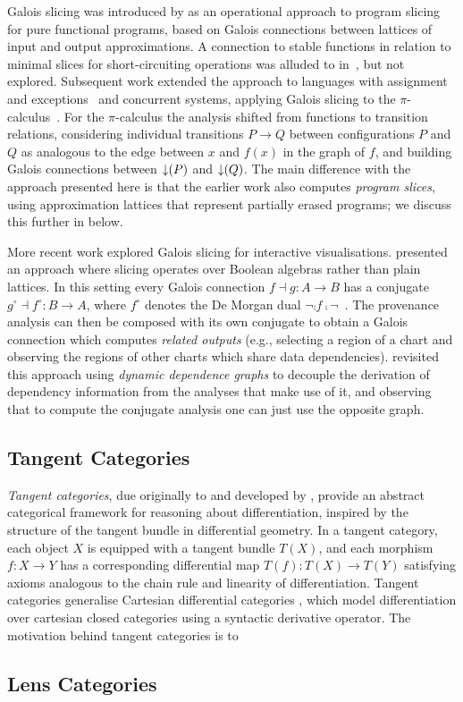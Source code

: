 Galois slicing was introduced by \citet{perera12a} as an operational approach to program slicing for pure
functional programs, based on Galois connections between lattices of input and output approximations. A
connection to stable functions in relation to minimal slices for short-circuiting operations was alluded to
in~\citet{perera13}, but not explored. Subsequent work extended the approach to languages with assignment and
exceptions~\cite{ricciotti17} and concurrent systems, applying Galois slicing to the
$\pi$-calculus~\cite{perera16d}. For the $\pi$-calculus the analysis shifted from functions to transition
relations, considering individual transitions $P \longrightarrow Q$ between configurations $P$ and $Q$ as
analogous to the edge between $x$ and $f(x)$ in the graph of $f$, and building Galois connections between
$\mathop{\downarrow}(P)$ and $\mathop{\downarrow}(Q)$. The main difference with the approach presented here is that the earlier work
also computes \emph{program slices}, using approximation lattices that represent partially erased programs; we
discuss this further in  below.

More recent work explored Galois slicing for interactive visualisations. \citet{perera22} presented an
approach where slicing operates over Boolean algebras rather than plain lattices. In this setting every Galois
connection $f \dashv g: A \to B$ has a conjugate $g^\circ \dashv f^\circ: B \to A$, where $f^\circ$ denotes
the De Morgan dual $\neg \comp f \comp \neg$~\cite{jonsson51}. The provenance analysis can then be composed
with its own conjugate to obtain a Galois connection which computes \emph{related outputs} (e.g., selecting a
region of a chart and observing the regions of other charts which share data dependencies). \citet{bond25}
revisited this approach using \emph{dynamic dependence graphs} to decouple the derivation of dependency
information from the analyses that make use of it, and observing that to compute the conjugate analysis one
can just use the opposite graph.

\subsection{Tangent Categories}

\emph{Tangent categories}, due originally to \citet{rosický84} and developed by \citet{cockett14,cockett18},
provide an abstract categorical framework for reasoning about differentiation, inspired by the structure of
the tangent bundle in differential geometry. In a tangent category, each object $X$ is equipped with a tangent
bundle $T(X)$, and each morphism $f: X \to Y$ has a corresponding differential map $T(f): T(X) \to T(Y)$
satisfying axioms analogous to the chain rule and linearity of differentiation. Tangent categories generalise
Cartesian differential categories \cite{cdcs}, which model differentiation over cartesian closed categories
using a syntactic derivative operator. The motivation behind tangent categories is to 

\subsection{Lens Categories}

\cite{spivak19}
